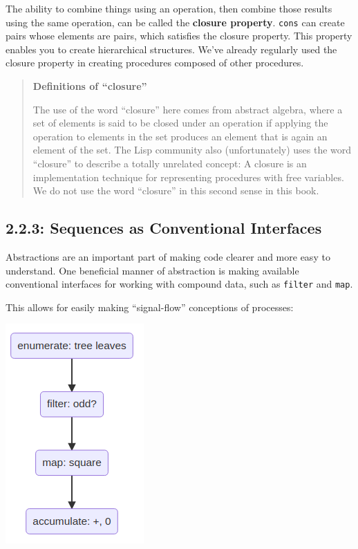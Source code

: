 \documentclass[final,fleqn,titlepage]{article}
\begin{document}
The ability to combine things using an operation, then combine those results
using the same operation, can be called the \textbf{closure property}. \texttt{cons} can
create pairs whose elements are pairs, which satisfies the closure property.
This property enables you to create hierarchical structures. We've already
regularly used the closure property in creating procedures composed of other
procedures.

\begin{quote}
\textbf{Definitions of ``closure''}

The use of the word ``closure'' here comes from abstract algebra, where a set of
elements is said to be closed under an operation if applying the operation to
elements in the set produces an element that is again an element of the set.
The Lisp community also (unfortunately) uses the word ``closure'' to describe a
totally unrelated concept: A closure is an implementation technique for
representing procedures with free variables. We do not use the word ``closure''
in this second sense in this book.
\end{quote}

\subsection{2.2.3: Sequences as Conventional Interfaces}
\label{sec:org4b90507}
Abstractions are an important part of making code clearer and more easy to
understand. One beneficial manner of abstraction is making available
conventional interfaces for working with compound data, such as \texttt{filter} and
\texttt{map}.

This allows for easily making ``signal-flow'' conceptions of processes:

\begin{center}
\includegraphics[width=0.3\linewidth]{2/fig/t_2-2-3.png}
\end{center}
\end{document}
